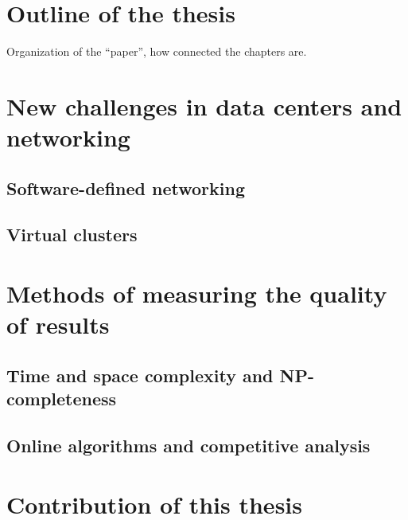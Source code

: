 \section{Outline of the thesis}


Organization of the ``paper'', how connected the chapters are.


\section{New challenges in data centers and networking}

\subsection{Software-defined networking}
\subsection{Virtual clusters}


\section{Methods of measuring the quality of results}

\subsection{Time and space complexity and NP-completeness}
\subsection{Online algorithms and competitive analysis}

\section{Contribution of this thesis}